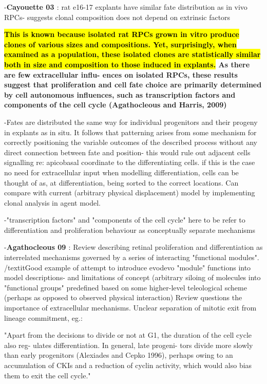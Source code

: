 \documentclass{ut-thesis}
\begin{document}
-\textbf{Cayouette 03 \cite{Cayouette2003}}: rat e16-17 explants have similar fate distribution as in vivo RPCs- suggests clonal composition does not depend on extrinsic factors

\bigskip
\textbf{\hl{This is known because isolated rat RPCs
grown in vitro produce clones of various sizes and compositions.
Yet, surprisingly, when examined as a population, these isolated
clones are statistically similar both in size and composition to
those induced in explants.} As there are few extracellular influ-
ences on isolated RPCs, these results suggest that proliferation
and cell fate choice are primarily determined by cell autonomous
influences, such as transcription factors and components of the
cell cycle (Agathocleous and Harris, 2009)}

\bigskip
-Fates are distributed the same way for individual progenitors and their progeny in explants as in situ. It follows that patterning arises from some mechanism for correctly positioning the variable outcomes of the described process without any direct connection between fate and position- this would rule out adjacent cells signalling re: apicobasal coordinate to the differentiating cells. if this is the case no need for extracellular input when modelling differentiation, cells can be thought of as, at differentiation, being sorted to the correct locations. Can compare with current (arbitrary physical displacement) model by implementing clonal analysis in agent model.

-"transcription factors" and "components of the cell cycle" here to be refer to differentiation and proliferation behaviour as conceptually separate mechanisms

-\textbf{Agathocleous 09 \cite{Agathocleous2009}}: Review describing retinal proliferation and differentiation as interrelated mechanisms governed by a series of interacting "functional modules". /textit{Good example of attempt to introduce evodevo "module" functions into model descriptions- and limitations of concept (arbitrary siloing of molecules into "functional groups" predefined based on some higher-level teleological scheme (perhaps as opposed to observed physical interaction)} Review questions the importance of extracellular mechanisms. Unclear separation of mitotic exit from lineage commitment, eg.:

"Apart from the decisions to divide or not
at G1, the duration of the cell cycle also reg-
ulates differentiation. In general, late progeni-
tors divide more slowly than early progenitors
(Alexiades and Cepko 1996), perhaps owing to
an accumulation of CKIs and a reduction of
cyclin activity, which would also bias them to
exit the cell cycle."
\end{document}
